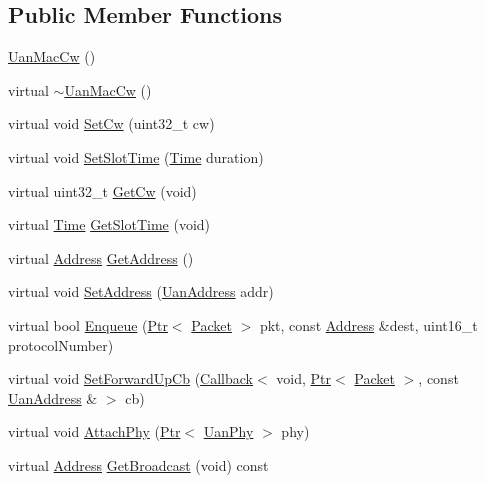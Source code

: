 \subsection*{Public Member Functions}
\begin{DoxyCompactItemize}
\item 
\hyperlink{classns3_1_1UanMacCw_a50c713ad2e3ae2459450b06f66efac92}{Uan\+Mac\+Cw} ()
\item 
virtual \hyperlink{classns3_1_1UanMacCw_a8c98172dcabfc500fb0c6f2f7820b3ec}{$\sim$\+Uan\+Mac\+Cw} ()
\item 
virtual void \hyperlink{classns3_1_1UanMacCw_a83261433c809acc7f95f8cfaff36bc87}{Set\+Cw} (uint32\+\_\+t cw)
\item 
virtual void \hyperlink{classns3_1_1UanMacCw_a31e35fc7385777f1f494f0bac999bbb2}{Set\+Slot\+Time} (\hyperlink{classns3_1_1Time}{Time} duration)
\item 
virtual uint32\+\_\+t \hyperlink{classns3_1_1UanMacCw_a9a108f102c81e86b0447baacd12f63cd}{Get\+Cw} (void)
\item 
virtual \hyperlink{classns3_1_1Time}{Time} \hyperlink{classns3_1_1UanMacCw_acafe869b8fffd895b4a4fb8bf081a907}{Get\+Slot\+Time} (void)
\item 
virtual \hyperlink{classns3_1_1Address}{Address} \hyperlink{classns3_1_1UanMacCw_a8f01576d9b4688a4d8ddcb80df940c1f}{Get\+Address} ()
\item 
virtual void \hyperlink{classns3_1_1UanMacCw_a2b5f6cc82d933ee21a77d9613157ce65}{Set\+Address} (\hyperlink{classns3_1_1UanAddress}{Uan\+Address} addr)
\item 
virtual bool \hyperlink{classns3_1_1UanMacCw_a1df73728c07de30c429e6b4027fba435}{Enqueue} (\hyperlink{classns3_1_1Ptr}{Ptr}$<$ \hyperlink{classns3_1_1Packet}{Packet} $>$ pkt, const \hyperlink{classns3_1_1Address}{Address} \&dest, uint16\+\_\+t protocol\+Number)
\item 
virtual void \hyperlink{classns3_1_1UanMacCw_a35f39a45338235dc60af79a1fd8eabc9}{Set\+Forward\+Up\+Cb} (\hyperlink{classns3_1_1Callback}{Callback}$<$ void, \hyperlink{classns3_1_1Ptr}{Ptr}$<$ \hyperlink{classns3_1_1Packet}{Packet} $>$, const \hyperlink{classns3_1_1UanAddress}{Uan\+Address} \& $>$ cb)
\item 
virtual void \hyperlink{classns3_1_1UanMacCw_abd7e18f187563f291d2bf89bfc00fe8d}{Attach\+Phy} (\hyperlink{classns3_1_1Ptr}{Ptr}$<$ \hyperlink{classns3_1_1UanPhy}{Uan\+Phy} $>$ phy)
\item 
virtual \hyperlink{classns3_1_1Address}{Address} \hyperlink{classns3_1_1UanMacCw_ae342d97f4d298c7eaaf221cbc0e1fd51}{Get\+Broadcast} (void) const 

\end{DoxyCompactItemize}
